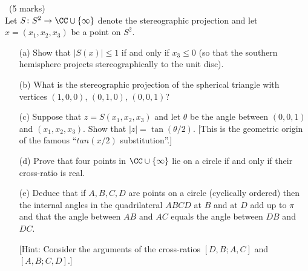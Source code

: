\documentclass[12pt]{article}
\begin{document}
\begin{question}\ (5 marks)\\
  Let $S\colon S^2\to\CC\cup\{\infty\}$ denote the stereographic projection and let $x=(x_1,x_2,x_3)$ be a point on $S^2$.
  \begin{enumerate}
  \item[(a)] Show that $|S(x)|\leq 1$ if and only if $x_3\leq 0$ (so that the southern hemisphere projects stereographically to the unit disc).
  \item[(b)] What is the stereographic projection of the spherical triangle with vertices $(1,0,0)$, $(0,1,0)$, $(0,0,1)$?
  \item[(c)] Suppose that $z=S(x_1,x_2,x_3)$ and let $\theta$ be the angle between $(0,0,1)$ and $(x_1,x_2,x_3)$. Show that $|z|=\tan(\theta/2)$. [This is the geometric origin of the famous ``$tan(x/2)$ substitution''.]
  \item[(d)] Prove that four points in $\CC\cup\{\infty\}$ lie on a circle if and only if their cross-ratio is real.
  \item[(e)] Deduce that if $A,B,C,D$ are points on a circle (cyclically ordered) then the internal angles in the quadrilateral $ABCD$ at $B$ and at $D$ add up to $\pi$ and that the angle between $AB$ and $AC$ equals the angle between $DB$ and $DC$.
    
    [Hint: Consider the arguments of the cross-ratios $[D,B;A,C]$ and $[A,B;C,D]$.]
  \end{enumerate}
\end{question}
\iffalse
\end{document}

